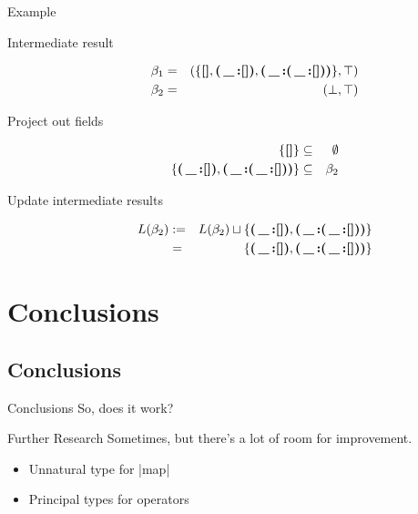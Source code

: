 \documentclass{beamer}
\newcommand{\Nill}{\textbf{[]}}
\newcommand{\Conss}[1]{\textbf{(\,\_\,:}#1\textbf{)}}
\begin{document}
\begin{frame}{Example}
\begin{description}
\item[Intermediate result] \begin{eqnarray*} \beta_1 &=& (\{\Nill, \Conss{\Nill}, \Conss{\Conss{\Nill}}\}, \top) \\ \beta_2 &=& (\bot, \top)\end{eqnarray*}
\item[Project out fields] \begin{eqnarray*}  \{\Nill\} &\subseteq& \emptyset \\ \{\Conss{\Nill}, \Conss{\Conss{\Nill}}\} &\subseteq& \beta_2 \end{eqnarray*}
\item[Update intermediate results] \begin{eqnarray*}L(\beta_2) &:=& L(\beta_2) \sqcup \{\Conss{\Nill}, \Conss{\Conss{\Nill}}\} \\&=& \{\Conss{\Nill}, \Conss{\Conss{\Nill}}\}\end{eqnarray*}
\end{description}
\end{frame}

\section{Conclusions}

\subsection{Conclusions}

\begin{frame}{Conclusions}
So, does it work?
\end{frame}

\begin{frame}{Further Research}
Sometimes, but there's a lot of room for improvement.
\begin{itemize}
\item Unnatural type for |map|
\item Principal types for operators
\end{itemize}
\end{frame}
\end{document}
